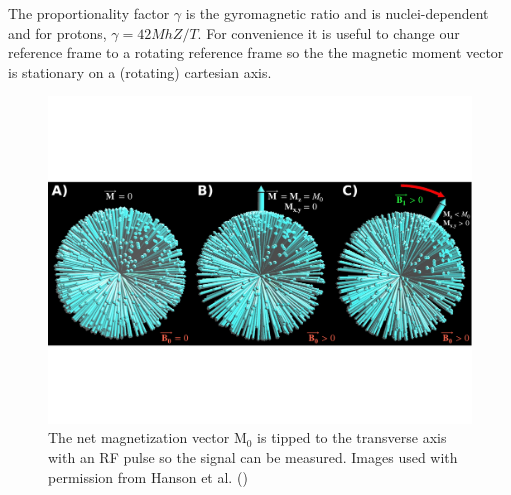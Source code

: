 The proportionality factor $\gamma$ is the gyromagnetic ratio and is nuclei-dependent and for protons, $\gamma = 42 MhZ /T$.
For convenience it is useful to change our reference frame to a rotating reference frame so the the magnetic moment vector is stationary on a (rotating) cartesian axis.
\begin{figure}
	\centering
	\includegraphics[width=\textwidth]{./intro/intro-images/HansonMRI.pdf}
	\caption[Spins getting tipped with an RF pulse]{The net magnetization vector M$_0$ is tipped to the transverse axis with an RF pulse so the signal can be measured. 
Images used with permission from Hanson et al. 
(\cite{Hanson:2008tp})}
	\label{spinsB0B1}
\end{figure}

